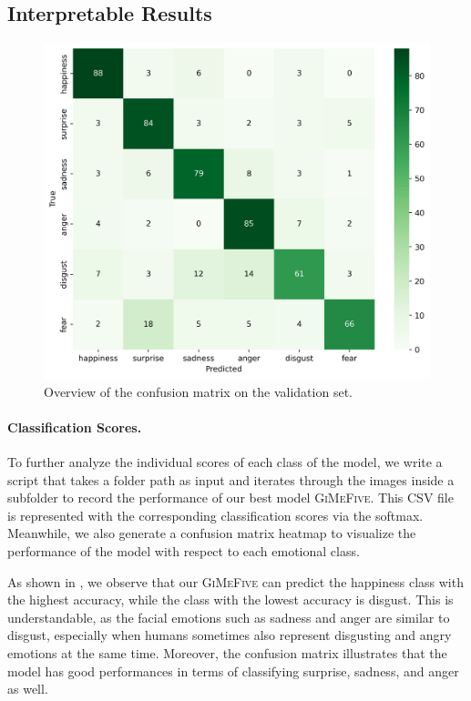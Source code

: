\subsection{Interpretable Results}
\label{sec:evaluation:inter}

\begin{figure}[ht]
  \centering
   \includegraphics[width=\linewidth]{matval.png}
   \caption{Overview of the confusion matrix on the validation set.} 
   \label{fig:matval}
\end{figure}

\paragraph{Classification Scores.} 
To further analyze the individual scores of each class of the model, 
we write a script that takes a folder path as input and iterates through the images inside a subfolder to record the performance of our best model \textsc{GiMeFive}. 
This CSV file is represented with the corresponding classification scores via the softmax. 
Meanwhile, 
we also generate a confusion matrix heatmap to visualize the performance of the model with respect to each emotional class.

As shown in , 
we observe that our \textsc{GiMeFive} can predict the happiness class with the highest accuracy, 
while the class with the lowest accuracy is disgust. 
This is understandable, 
as the facial emotions such as sadness and anger are similar to disgust, 
especially when humans sometimes also represent disgusting and angry emotions at the same time. 
Moreover, 
the confusion matrix illustrates that the model has good performances in terms of classifying surprise, sadness, and anger as well. 


